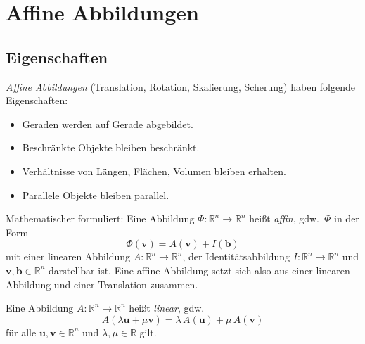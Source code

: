 \documentclass[a4paper, 11pt, accentcolor = tud3b]{tudreport}
\newcommand{\R}{\mathbb{R}}
\renewcommand{\vec}[1]{\boldsymbol{\mathbf{#1}}}
\newcommand{\gdw}{gdw.~}
\begin{document}
		\section{Affine Abbildungen}
			\subsection{Eigenschaften}
				\emph{Affine Abbildungen} (Translation, Rotation, Skalierung, Scherung) haben folgende Eigenschaften:
				\begin{itemize}
					\item Geraden werden auf Gerade abgebildet.
					\item Beschränkte Objekte bleiben beschränkt.
					\item Verhältnisse von Längen, Flächen, Volumen bleiben erhalten.
					\item Parallele Objekte bleiben parallel.
				\end{itemize}
			
				Mathematischer formuliert: Eine Abbildung \( \Phi : \R^n \to \R^n \) heißt \emph{affin}, \gdw \( \Phi \) in der Form
				\begin{equation*}
					\Phi(\vec{v}) = A(\vec{v}) + I(\vec{b})
				\end{equation*}
				mit einer linearen Abbildung \( A : \R^n \to \R^n \), der Identitätsabbildung \( I : \R^n \to \R^n \) und \( \vec{v}, \vec{b} \in \R^n \) darstellbar ist. Eine affine Abbildung setzt sich also aus einer linearen Abbildung und einer Translation zusammen.
				
				Eine Abbildung \( A : \R^n \to \R^n \) heißt \emph{linear}, \gdw
				\begin{equation*}
					A(\lambda \vec{u} + \mu \vec{v}) = \lambda \, A(\vec{u}) + \mu \, A(\vec{v})
				\end{equation*}
				für alle \( \vec{u}, \vec{v} \in \R^n \) und \( \lambda, \mu \in \R \) gilt.
\end{document}
